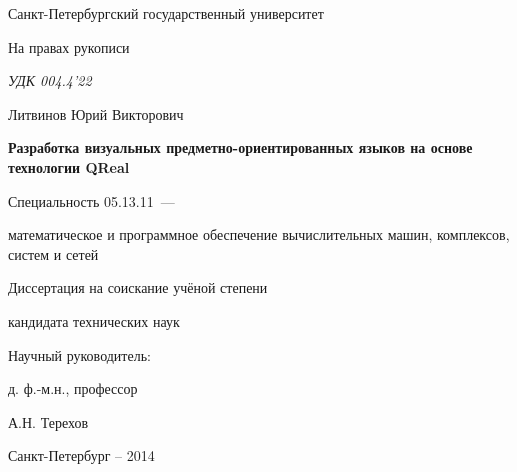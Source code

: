 \thispagestyle{empty}

\begin{center}
Санкт-Петербургский государственный университет\par
\par 
\par
\end{center}

\vspace{20mm}
\begin{flushright}
На правах рукописи

{\sl УДК 004.4'22}
\end{flushright}

\vspace{30mm}
\begin{center}
{\large Литвинов Юрий Викторович}
\end{center}

\vspace{5mm}
\begin{center}
{\bf \large Разработка визуальных предметно-ориентированных языков на основе технологии QReal
\par}

\vspace{10mm}
{%
Специальность 05.13.11~---

математическое и программное обеспечение вычислительных машин, комплексов, систем и сетей
}

\vspace{10mm}
Диссертация на соискание учёной степени

кандидата технических наук
\end{center}

\vspace{20mm}
\begin{flushright}
Научный руководитель:

д. ф.-м.н., профессор

А.Н. Терехов

\end{flushright}

\vspace{20mm}
\begin{center}
{Санкт-Петербург -- 2014}
\end{center}

\newpage